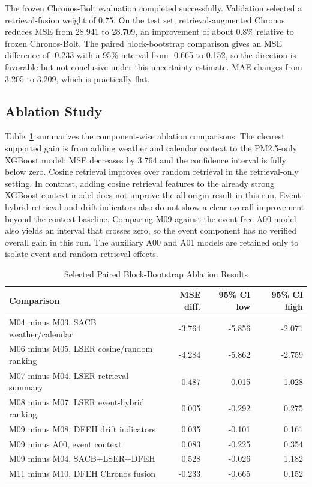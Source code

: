The frozen Chronos-Bolt evaluation completed successfully. Validation selected
a retrieval-fusion weight of 0.75. On the test set,
retrieval-augmented Chronos reduces MSE from 28.941 to 28.709, an improvement of
about 0.8\% relative to frozen Chronos-Bolt. The paired block-bootstrap
comparison gives an MSE difference of -0.233 with a 95\% interval from -0.665 to
0.152, so the direction is favorable but not conclusive under this uncertainty
estimate. MAE changes from 3.205 to 3.209, which is practically flat.

\subsection{Ablation Study}
Table~\ref{tab:ablation_results} summarizes the component-wise ablation comparisons. The
clearest supported gain is from adding weather and calendar context to the
PM2.5-only XGBoost model: MSE decreases by 3.764 and the confidence interval is
fully below zero. Cosine retrieval improves over random retrieval in the
retrieval-only setting. In contrast, adding cosine retrieval features to the
already strong XGBoost context model does not improve the all-origin result in
this run. Event-hybrid retrieval and drift indicators also do not show a clear
overall improvement beyond the context baseline. Comparing M09 against the
event-free A00 model also yields an interval that crosses zero, so the event
component has no verified overall gain in this run. The auxiliary A00 and A01
models are retained only to isolate event and random-retrieval effects.

\begin{table}[!t]
\centering
\caption{Selected Paired Block-Bootstrap Ablation Results}
\label{tab:ablation_results}
\begin{tabular}{lrrr}
\toprule
Comparison & MSE diff. & 95\% CI low & 95\% CI high \\
\midrule
M04 minus M03, SACB weather/calendar & -3.764 & -5.856 & -2.071 \\
M06 minus M05, LSER cosine/random ranking & -4.284 & -5.862 & -2.759 \\
M07 minus M04, LSER retrieval summary & 0.487 & 0.015 & 1.028 \\
M08 minus M07, LSER event-hybrid ranking & 0.005 & -0.292 & 0.275 \\
M09 minus M08, DFEH drift indicators & 0.035 & -0.101 & 0.161 \\
M09 minus A00, event context & 0.083 & -0.225 & 0.354 \\
M09 minus M04, SACB+LSER+DFEH & 0.528 & -0.026 & 1.182 \\
M11 minus M10, DFEH Chronos fusion & -0.233 & -0.665 & 0.152 \\
\bottomrule
\end{tabular}
\end{table}

